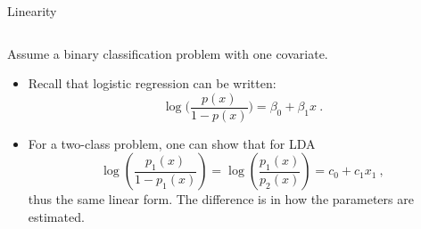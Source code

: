 \documentclass[10pt,ignorenonframetext,]{beamer}
\begin{document}
\begin{frame}

\begin{block}{Linearity}

\(~\)

Assume a binary classification problem with one covariate.

\vspace{2mm}

\begin{itemize}
\item
  Recall that logistic regression can be written:
  \[\log \Big ( \frac{p(x)}{1-p(x)}\Big ) = \beta_0 + \beta_1 x  \ .\]
\item
  For a two-class problem, one can show that for LDA
  \[\log\left(\frac{p_1(x)}{1-p_1(x)}\right) = \log\left(\frac{p_1(x)}{p_2(x)}\right) = c_0 + c_1 x_1 \ , \]
  thus the same linear form. The difference is in how the parameters are
  estimated.
\end{itemize}

\end{block}

\end{frame}
\end{document}
